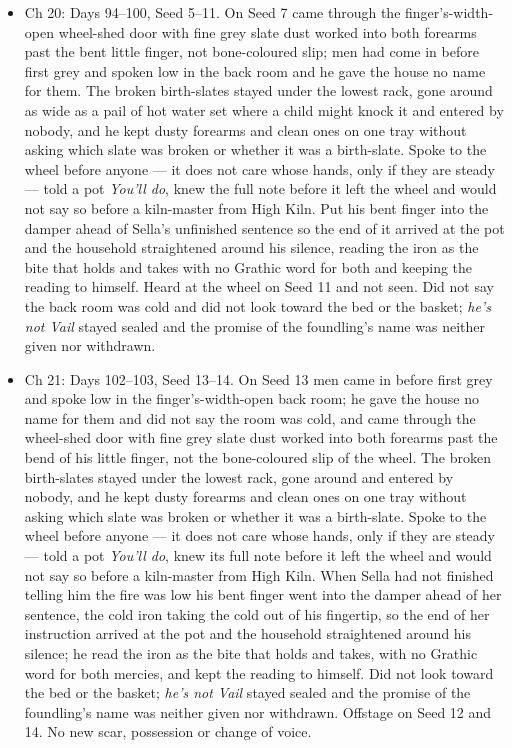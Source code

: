 \documentclass{design/chronicle}
\begin{document}
{\begin{itemize}[leftmargin=1.4em,itemsep=1pt,topsep=3pt,parsep=0pt]
\item Ch 20: Days 94–100, Seed 5–11. On Seed 7 came through the finger’s-width-open wheel-shed door with fine grey slate dust worked into both forearms past the bent little finger, not bone-coloured slip; men had come in before first grey and spoken low in the back room and he gave the house no name for them. The broken birth-slates stayed under the lowest rack, gone around as wide as a pail of hot water set where a child might knock it and entered by nobody, and he kept dusty forearms and clean ones on one tray without asking which slate was broken or whether it was a birth-slate. Spoke to the wheel before anyone --- it does not care whose hands, only if they are steady --- told a pot \emph{You’ll do}, knew the full note before it left the wheel and would not say so before a kiln-master from High Kiln. Put his bent finger into the damper ahead of Sella’s unfinished sentence so the end of it arrived at the pot and the household straightened around his silence, reading the iron as the bite that holds and takes with no Grathic word for both and keeping the reading to himself. Heard at the wheel on Seed 11 and not seen. Did not say the back room was cold and did not look toward the bed or the basket; \emph{he’s not Vail} stayed sealed and the promise of the foundling’s name was neither given nor withdrawn.

\end{itemize}

\begin{itemize}[leftmargin=1.4em,itemsep=1pt,topsep=3pt,parsep=0pt]

\item Ch 21: Days 102–103, Seed 13–14. On Seed 13 men came in before first grey and spoke low in the finger’s-width-open back room; he gave the house no name for them and did not say the room was cold, and came through the wheel-shed door with fine grey slate dust worked into both forearms past the bend of his little finger, not the bone-coloured slip of the wheel. The broken birth-slates stayed under the lowest rack, gone around and entered by nobody, and he kept dusty forearms and clean ones on one tray without asking which slate was broken or whether it was a birth-slate. Spoke to the wheel before anyone — it does not care whose hands, only if they are steady — told a pot \emph{You’ll do}, knew its full note before it left the wheel and would not say so before a kiln-master from High Kiln. When Sella had not finished telling him the fire was low his bent finger went into the damper ahead of her sentence, the cold iron taking the cold out of his fingertip, so the end of her instruction arrived at the pot and the household straightened around his silence; he read the iron as the bite that holds and takes, with no Grathic word for both mercies, and kept the reading to himself. Did not look toward the bed or the basket; \emph{he’s not Vail} stayed sealed and the promise of the foundling’s name was neither given nor withdrawn. Offstage on Seed 12 and 14. No new scar, possession or change of voice.


\end{itemize}}
\end{document}
